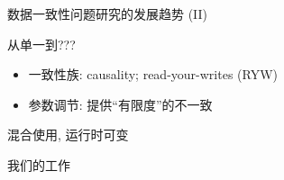 \begin{frame}{数据一致性问题研究的发展趋势 (II)}
  \begin{description}
	\setlength{\itemsep}{20pt}
	\item[多样化:] 从单一到???
	  \begin{itemize}
		\item 一致性族: causality; read-your-writes {\scriptsize (RYW)}
		\item 参数调节: 提供``有限度''的不一致 
	  \end{itemize}
	\item[可调节:] 混合使用, 运行时可变
  \end{description}
\end{frame}
\begin{frame}{我们的工作}
  
\end{frame}
